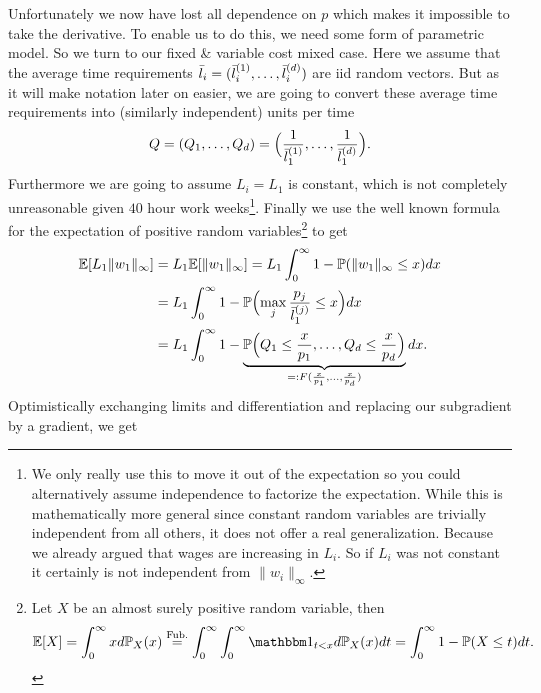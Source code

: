 Unfortunately we now have lost all dependence on \(p\) which makes it impossible
to take the derivative. To enable us to do this, we need some form of parametric
model. So we turn to our fixed \& variable cost mixed case. Here we assume that
the average time requirements \(\bar{l}_i= (\bar{l}_i^{(1)}, \dots,
\bar{l}_i^{(d)})\) are iid random vectors. But as it will make notation
later on easier, we are going to convert these average time requirements into
(similarly independent) units per time
\[
	Q = (Q_1,\dots, Q_d)
	= \Bigl(\frac1{\bar{l}_1^{(1)}}, \dots, \frac1{\bar{l}_1^{(d)}}\Bigr).
\]
Furthermore we are going to assume \(L_i=L_1\) is constant, which is not
completely unreasonable given \(40\) hour work weeks\footnote{
	We only really use this to move it out of the expectation so you could
	alternatively assume independence to factorize the expectation. While this
	is mathematically more general since constant random variables are trivially
	independent from all others, it does not offer a real generalization. Because
	we already argued that wages are increasing in \(L_i\). So if \(L_i\) was
	not constant it certainly is not independent from \(\|w_i\|_\infty\).
}.
Finally we use the well known formula for the expectation of positive random
variables\footnote{
	Let \(X\) be an almost surely positive random variable, then
	\[
		\E[X]	= \int_0^\infty x d\Pr_X(x)
		\overset{\text{Fub.}}= \int_0^\infty \int_0^\infty \ind_{t < x}d\Pr_X(x)dt
		= \int_0^\infty 1- \Pr(X \le t)dt.
	\]
} to get
\begin{align*}
	\mathbb{E}[L_1\|w_1\|_\infty]
	&= L_1 \mathbb{E}[\|w_1\|_\infty]
	= L_1 \int_0^\infty 1 - \mathbb{P}(\|w_1\|_\infty \le x)dx\\
	&= L_1 \int_0^\infty 1- \mathbb{P}\Bigl(\max_j \frac{p_j}{\bar{l}_1^{(j)}} \le x\Bigr)dx\\
	&= L_1 \int_0^\infty 1- 
	\underbrace{
		\mathbb{P}\Bigl(Q_1 \le \frac{x}{p_1}, \dots, Q_d \le \frac{x}{p_d}\Bigr)
	}_{=: F(\frac{x}{p_1},\dots,\frac{x}{p_d})}dx.
\end{align*}
Optimistically exchanging limits and differentiation and replacing our
subgradient by a gradient, we get
